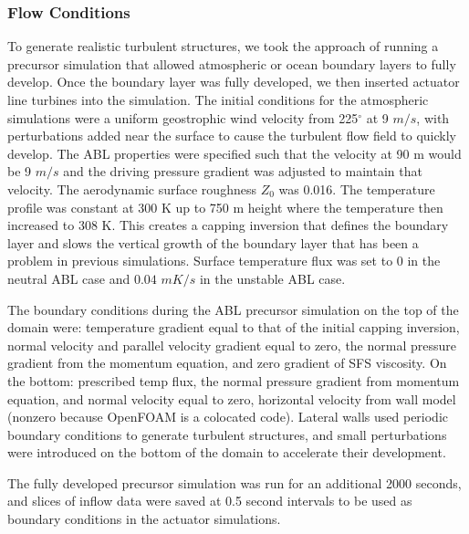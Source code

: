 \subsubsection{Flow Conditions}
To generate realistic turbulent structures, we took the approach of running a precursor simulation that allowed atmospheric or ocean boundary layers to fully develop.  Once the boundary layer was fully developed, we then inserted actuator line turbines into the simulation.  The initial conditions for the atmospheric simulations were a uniform geostrophic wind velocity from 225$^\circ$  at 9 $m/s$, with perturbations added near the surface to cause the turbulent flow field to quickly develop.  The ABL properties were specified such that the velocity at 90 m would be 9 $m/s$ and the driving pressure gradient was adjusted to maintain that velocity.  The aerodynamic surface roughness $Z_{0}$ was 0.016.  The temperature profile was constant at 300 K up to 750 m height where the temperature then increased to 308 K.  This creates a capping inversion that defines the boundary layer and slows the vertical growth of the boundary layer that has been a problem in previous simulations.  Surface temperature flux was set to 0 in the neutral ABL case and $0.04$ $mK/s$ in the unstable ABL case.


The boundary conditions during the ABL precursor simulation on the top of the domain were: temperature gradient equal to that of the initial capping inversion, normal velocity  and parallel velocity gradient equal to zero, the normal pressure gradient from the momentum equation, and zero gradient of SFS viscosity.  On the bottom: prescribed temp flux, the normal pressure gradient from momentum equation, and normal velocity equal to zero, horizontal velocity from wall model (nonzero because OpenFOAM is a colocated code).  Lateral walls used periodic boundary conditions to generate turbulent structures, and small perturbations were introduced on the bottom of the domain to accelerate their development.

The fully developed precursor simulation was run for an additional 2000 seconds, and slices of inflow data were saved at 0.5 second intervals to be used as boundary conditions in the actuator simulations.

